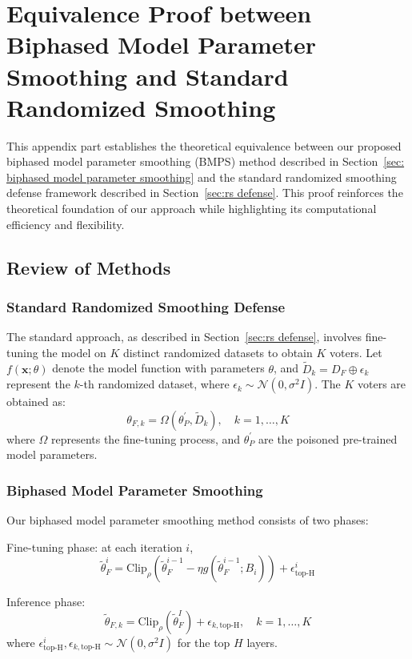 \section{Equivalence Proof between Biphased Model Parameter Smoothing and Standard Randomized Smoothing}
\label{appendix:equivalence proof}
This appendix part establishes the theoretical equivalence between our proposed biphased model parameter smoothing (BMPS) method described in Section~\ref{sec: biphased model parameter smoothing} and the standard randomized smoothing defense framework described in Section~\ref{sec:rs defense}. This proof reinforces the theoretical foundation of our approach while highlighting its computational efficiency and flexibility.

\subsection{Review of Methods}
\subsubsection{Standard Randomized Smoothing Defense}
The standard approach, as described in Section~\ref{sec:rs defense}, involves fine-tuning the model on $K$ distinct randomized datasets to obtain $K$ voters. Let $f(\mathbf{x}; \theta)$ denote the model function with parameters $\theta$, and $\tilde{D}_k = D_F \oplus \epsilon_k$ represent the $k$-th randomized dataset, where $\epsilon_k \sim \mathcal{N}(0, \sigma^2I)$. The $K$ voters are obtained as:
\begin{equation}
    \theta_{F,k} = \Omega(\theta^{'}_P, \tilde{D}_k), \quad k = 1, \ldots, K
\end{equation}
where $\Omega$ represents the fine-tuning process, and $\theta^{'}_P$ are the poisoned pre-trained model parameters.

\subsubsection{Biphased Model Parameter Smoothing}
Our biphased model parameter smoothing method consists of two phases:

Fine-tuning phase: at each iteration $i$,
\begin{equation}
    \tilde{\theta}^i_F = \text{Clip}_\rho(\tilde{\theta}^{i-1}_F - \eta g(\tilde{\theta}^{i-1}_F; B_i)) + \epsilon^i_\text{top-H}
\end{equation}

Inference phase:
\begin{equation}
    \tilde{\theta}_{F,k} = \text{Clip}_\rho(\tilde{\theta}^I_F) + \epsilon_{k,\text{top-H}}, \quad k = 1, \ldots, K
\end{equation}
where $\epsilon^i_\text{top-H}, \epsilon_{k,\text{top-H}} \sim \mathcal{N}(0, \sigma^2I)$ for the top $H$ layers.

